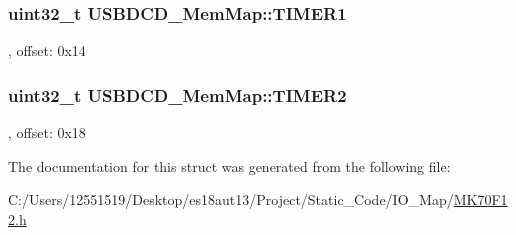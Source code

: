 \subsubsection[{T\+I\+M\+E\+R1}]{\setlength{\rightskip}{0pt plus 5cm}uint32\+\_\+t U\+S\+B\+D\+C\+D\+\_\+\+Mem\+Map\+::\+T\+I\+M\+E\+R1}\label{struct_u_s_b_d_c_d___mem_map_aa8bcdbeba3cbd7a27281d317ba5484e9}
, offset\+: 0x14 \hypertarget{struct_u_s_b_d_c_d___mem_map_abaa84a33ed5173cf08f87f3590a3f035}{}
\subsubsection[{T\+I\+M\+E\+R2}]{\setlength{\rightskip}{0pt plus 5cm}uint32\+\_\+t U\+S\+B\+D\+C\+D\+\_\+\+Mem\+Map\+::\+T\+I\+M\+E\+R2}\label{struct_u_s_b_d_c_d___mem_map_abaa84a33ed5173cf08f87f3590a3f035}
, offset\+: 0x18 

The documentation for this struct was generated from the following file\+:\begin{DoxyCompactItemize}
\item 
C\+:/\+Users/12551519/\+Desktop/es18aut13/\+Project/\+Static\+\_\+\+Code/\+I\+O\+\_\+\+Map/\hyperlink{_m_k70_f12_8h}{M\+K70\+F12.\+h}\end{DoxyCompactItemize}
